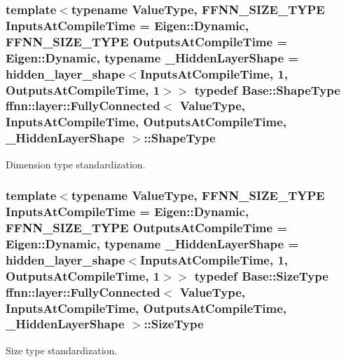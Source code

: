 \hypertarget{classffnn_1_1layer_1_1_fully_connected_a938c80efb16baa531fb424626f339333}{
\subsubsection[{Shape\-Type}]{\setlength{\rightskip}{0pt plus 5cm}template$<$typename Value\-Type, F\-F\-N\-N\-\_\-\-S\-I\-Z\-E\-\_\-\-T\-Y\-P\-E Inputs\-At\-Compile\-Time = Eigen\-::\-Dynamic, F\-F\-N\-N\-\_\-\-S\-I\-Z\-E\-\_\-\-T\-Y\-P\-E Outputs\-At\-Compile\-Time = Eigen\-::\-Dynamic, typename \-\_\-\-Hidden\-Layer\-Shape = hidden\-\_\-layer\-\_\-shape$<$\-Inputs\-At\-Compile\-Time, 1, Outputs\-At\-Compile\-Time, 1$>$$>$ typedef {\bf Base\-::\-Shape\-Type} {\bf ffnn\-::layer\-::\-Fully\-Connected}$<$ Value\-Type, Inputs\-At\-Compile\-Time, Outputs\-At\-Compile\-Time, \-\_\-\-Hidden\-Layer\-Shape $>$\-::{\bf Shape\-Type}}}\label{classffnn_1_1layer_1_1_fully_connected_a938c80efb16baa531fb424626f339333}


Dimension type standardization. 

\hypertarget{classffnn_1_1layer_1_1_fully_connected_a2924c85b3cc3e79db3f271cd22cac32c}{
\subsubsection[{Size\-Type}]{\setlength{\rightskip}{0pt plus 5cm}template$<$typename Value\-Type, F\-F\-N\-N\-\_\-\-S\-I\-Z\-E\-\_\-\-T\-Y\-P\-E Inputs\-At\-Compile\-Time = Eigen\-::\-Dynamic, F\-F\-N\-N\-\_\-\-S\-I\-Z\-E\-\_\-\-T\-Y\-P\-E Outputs\-At\-Compile\-Time = Eigen\-::\-Dynamic, typename \-\_\-\-Hidden\-Layer\-Shape = hidden\-\_\-layer\-\_\-shape$<$\-Inputs\-At\-Compile\-Time, 1, Outputs\-At\-Compile\-Time, 1$>$$>$ typedef {\bf Base\-::\-Size\-Type} {\bf ffnn\-::layer\-::\-Fully\-Connected}$<$ Value\-Type, Inputs\-At\-Compile\-Time, Outputs\-At\-Compile\-Time, \-\_\-\-Hidden\-Layer\-Shape $>$\-::{\bf Size\-Type}}}\label{classffnn_1_1layer_1_1_fully_connected_a2924c85b3cc3e79db3f271cd22cac32c}


Size type standardization. 

